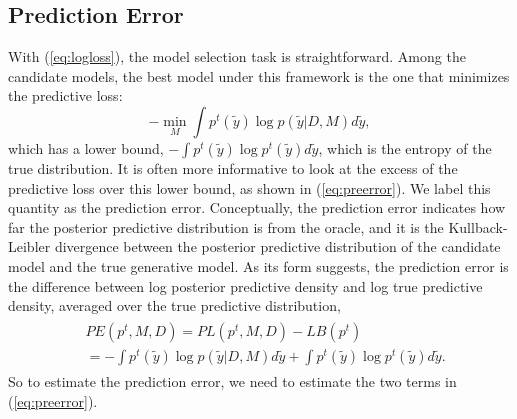 \documentclass[sii]{ipart}
\begin{document}
\subsection{Prediction Error}
With (\ref{eq:logloss}), the model selection task is straightforward. Among
the candidate models, the best model under this framework is the one that minimizes the predictive loss:
\begin{equation}
  \label{eq:minimizer}
  - \min_{M} \int \!p^t(\tilde y) \log p(\tilde y|D, M) d\tilde y,
\end{equation}
which has a lower bound, $-\!\int\! p^t(\tilde y) \log p^t(\tilde y) d\tilde
y$, which is the entropy of the true distribution. It is often more informative
to look at the excess of the predictive loss over this lower bound, as shown in
(\ref{eq:preerror}). We label this quantity as the prediction error. Conceptually, the
prediction error indicates how far the posterior predictive distribution is from
the oracle, and it is the Kullback-Leibler divergence between the
posterior predictive distribution of the candidate model and the true generative
model. As its form suggests, the prediction error is the difference between log
posterior predictive density and log true predictive density, averaged over the
true predictive distribution,
\begin{align}
\begin{split}
  \label{eq:preerror}
    &PE(p^t, M, D)= PL(p^t, M, D) - LB(p^t) \\  
               &=-\int p^t(\tilde y) \log p(\tilde y|D, M) d\tilde y+\int
               p^t(\tilde y) \log p^t(\tilde y) d\tilde y.
               \end{split}
\end{align}
So to estimate the prediction error, we need to estimate the two terms in (\ref{eq:preerror}).
\end{document}
